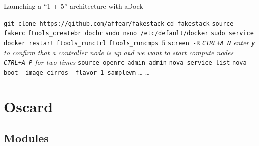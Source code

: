 \begin{algorithm}[H]
\caption{Launching a ``1 + 5'' architecture with aDock}
\label{alg:example}
\begin{algorithmic}[0]
	\State \texttt{git clone https://github.com/affear/fakestack}
	\State \texttt{cd fakestack}
	\State \texttt{source fakerc} 
	\State \texttt{ftools\_createbr docbr} 
	\State \texttt{sudo nano /etc/default/docker} 
	\State \texttt{sudo service docker restart}
	\State %
	\State \texttt{ftools\_runctrl}
	\State {}
	\State \texttt{ftools\_runcmps $5$}
	\State \texttt{screen -R} 
	\State \emph{\texttt{CTRL+A N}} 
	\State
	\State \emph{enter \texttt{y} to confirm that a controller node is up and we want to start compute nodes}
	\State
	\State {}
	\State \emph{\texttt{CTRL+A P} for two times} 
	\State \texttt{source openrc admin admin}
	\State \texttt{nova service-list} 
	\State \texttt{nova boot --image cirros --flavor 1 samplevm} 
	\State \ldots
	\State \ldots {}
\end{algorithmic}
\end{algorithm}


\section{Oscard}
\label{sec:oscard}

\subsection{Modules}
\label{sub:oscard_modules}

